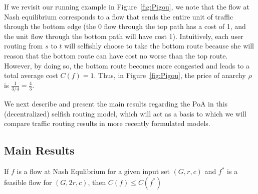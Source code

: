 If we revisit our running example in Figure~\ref{fig:Pigou}, we note that the flow at Nash equilibrium corresponds to a flow that sends the entire unit of traffic through the bottom edge (the 0 flow through the top path has a cost of 1, and the unit flow through the bottom path will have cost 1).
Intuitively, each user routing from $s$ to $t$ will selfishly choose to take the bottom route because she will reason that the bottom route can have cost no worse than the top route. However, by doing so, the bottom route becomes more congested and leads to a total average cost $C(f) = 1$.
Thus, in Figure~\ref{fig:Pigou}, the price of anarchy $\rho$ is $\frac{1}{3/4} = \frac{4}{3}$.



We next describe and present the main results regarding the PoA in this (decentralized) selfish routing model, which will act as a basis to which we will compare traffic routing results in more recently formulated models.

\subsection{Main Results}
\begin{theorem}
    If $f$ is a flow at Nash Equlibrium for a given input set $(G, r, c)$ and $f^*$ is a feasible flow for $(G, 2r, c)$, then $C(f) \leq C(f^*)$
\end{theorem}

